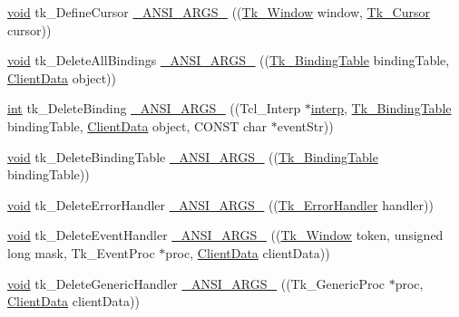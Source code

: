 \begin{DoxyCompactItemize}
\item 
\hyperlink{tk_8h_aba408b7cd755a96426e004c015f5de8e}{void} tk\+\_\+\+Define\+Cursor \hyperlink{struct_tk_stubs_aa00ae292a65f4e9309cdeaf794b6dd5a}{\+\_\+\+A\+N\+S\+I\+\_\+\+A\+R\+G\+S\+\_\+} ((\hyperlink{tk_8h_ab756137de3ee74edc2501bd0d761e37c}{Tk\+\_\+\+Window} window, \hyperlink{tk_8h_a9505b763a290e218b96e0e83fc275691}{Tk\+\_\+\+Cursor} cursor))
\item 
\hyperlink{tk_8h_aba408b7cd755a96426e004c015f5de8e}{void} tk\+\_\+\+Delete\+All\+Bindings \hyperlink{struct_tk_stubs_ac8d3c67b3358d46ec68d6bfe720d768c}{\+\_\+\+A\+N\+S\+I\+\_\+\+A\+R\+G\+S\+\_\+} ((\hyperlink{tk_8h_aba3b4bb6109d20b6e4bf79b230f23566}{Tk\+\_\+\+Binding\+Table} binding\+Table, \hyperlink{tk_8h_accf84b4d725a8f41e04d6333768a6001}{Client\+Data} object))
\item 
\hyperlink{tk_8h_a83f82f76e7fed06f4c49d2db94028a6d}{int} tk\+\_\+\+Delete\+Binding \hyperlink{struct_tk_stubs_aa2a4802fbc9c39220c3c4ae30408d3e8}{\+\_\+\+A\+N\+S\+I\+\_\+\+A\+R\+G\+S\+\_\+} ((Tcl\+\_\+\+Interp $\ast$\hyperlink{tk_8h_a5ab79c0f5849ee8e6a2e955a6c536cc0}{interp}, \hyperlink{tk_8h_aba3b4bb6109d20b6e4bf79b230f23566}{Tk\+\_\+\+Binding\+Table} binding\+Table, \hyperlink{tk_8h_accf84b4d725a8f41e04d6333768a6001}{Client\+Data} object, C\+O\+N\+ST char $\ast$event\+Str))
\item 
\hyperlink{tk_8h_aba408b7cd755a96426e004c015f5de8e}{void} tk\+\_\+\+Delete\+Binding\+Table \hyperlink{struct_tk_stubs_aaaac1107795e6e5923cf070fc20e8622}{\+\_\+\+A\+N\+S\+I\+\_\+\+A\+R\+G\+S\+\_\+} ((\hyperlink{tk_8h_aba3b4bb6109d20b6e4bf79b230f23566}{Tk\+\_\+\+Binding\+Table} binding\+Table))
\item 
\hyperlink{tk_8h_aba408b7cd755a96426e004c015f5de8e}{void} tk\+\_\+\+Delete\+Error\+Handler \hyperlink{struct_tk_stubs_af99e7bcb1f71c57f695b53f3b49be8ad}{\+\_\+\+A\+N\+S\+I\+\_\+\+A\+R\+G\+S\+\_\+} ((\hyperlink{tk_8h_a928c3fe7035efef54a033adeab316a46}{Tk\+\_\+\+Error\+Handler} handler))
\item 
\hyperlink{tk_8h_aba408b7cd755a96426e004c015f5de8e}{void} tk\+\_\+\+Delete\+Event\+Handler \hyperlink{struct_tk_stubs_a554322b5db03015b0e947b4d4780841b}{\+\_\+\+A\+N\+S\+I\+\_\+\+A\+R\+G\+S\+\_\+} ((\hyperlink{tk_8h_ab756137de3ee74edc2501bd0d761e37c}{Tk\+\_\+\+Window} token, unsigned long mask, Tk\+\_\+\+Event\+Proc $\ast$proc, \hyperlink{tk_8h_accf84b4d725a8f41e04d6333768a6001}{Client\+Data} client\+Data))
\item 
\hyperlink{tk_8h_aba408b7cd755a96426e004c015f5de8e}{void} tk\+\_\+\+Delete\+Generic\+Handler \hyperlink{struct_tk_stubs_a28090e2333d80a814b3d93e2e17cfc05}{\+\_\+\+A\+N\+S\+I\+\_\+\+A\+R\+G\+S\+\_\+} ((Tk\+\_\+\+Generic\+Proc $\ast$proc, \hyperlink{tk_8h_accf84b4d725a8f41e04d6333768a6001}{Client\+Data} client\+Data))

\end{DoxyCompactItemize}
